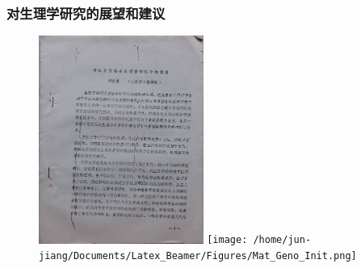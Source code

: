 \frame
{
	\frametitle{对生理学研究的展望和建议}
	{\fontsize{6.2pt}{4.2pt}}
\begin{figure}[h!] 
\centering
\vspace{-0.08in}
\includegraphics[height=0.60\textwidth,width=0.48\textwidth,clip]{Figures_Peking-Opera/Liu-Paper.jpg}
\texttt{[image: /home/jun-jiang/Documents/Latex\_Beamer/Figures/Mat\_Geno\_Init.png]}
\label{Liu-Paper}
\end{figure}
}

